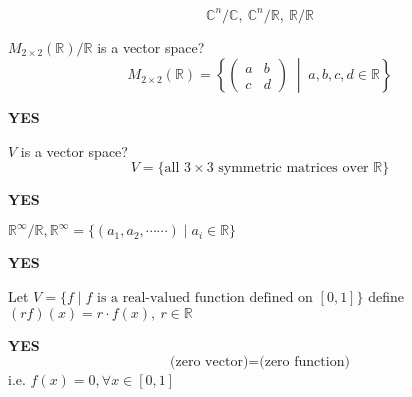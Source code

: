 \begin{eg}
\[
\mathbb{C}^n/\mathbb{C},\ \mathbb{C}^n/\mathbb{R}, \ \mathbb{R}/\mathbb{R}
\]
\end{eg}

\begin{exercise}
    $M_{2\times 2}(\mathbb{R})/\mathbb{R}$ is a vector space?
   \[
    M_{2\times 2}(\mathbb{R}) =
    \left\{ 
    \begin{pmatrix}
    a & b \\
    c & d
    \end{pmatrix}
    \;\middle|\;
    a, b, c, d \in \mathbb{R} 
    \right\}
    \]
\end{exercise}
\begin{answer}
    \textbf{YES}
\end{answer}

\begin{exercise}
    $V$ is a vector space?
   \[
    V = \{ \text{all } 3\times 3 \text{ symmetric  matrices over } \mathbb{R} \}
    \]
\end{exercise}
\begin{answer}
    \textbf{YES}
\end{answer}

\begin{exercise}
    $\mathbb{R}^\infty / \mathbb{R}, \mathbb{R}^\infty = \{(a_1, a_2, \cdots\cdots) \;|\; a_i \in \mathbb{R}\}$
\end{exercise}
\begin{answer}
    \textbf{YES}
\end{answer}

\newpage

\begin{exercise}
     Let $V = \{f \; | \; f \text{ is a real-valued function defined on } [0,1]\}$ define $(rf)(x) = r \cdot f(x), \ r\in \mathbb{R}$
\end{exercise}
\begin{answer}
    \textbf{YES}
    \[
    \text{(zero vector)} = \text{(zero function)}
    \]
    i.e. $f(x) = 0, \forall x \in [0,1]$
\end{answer}

